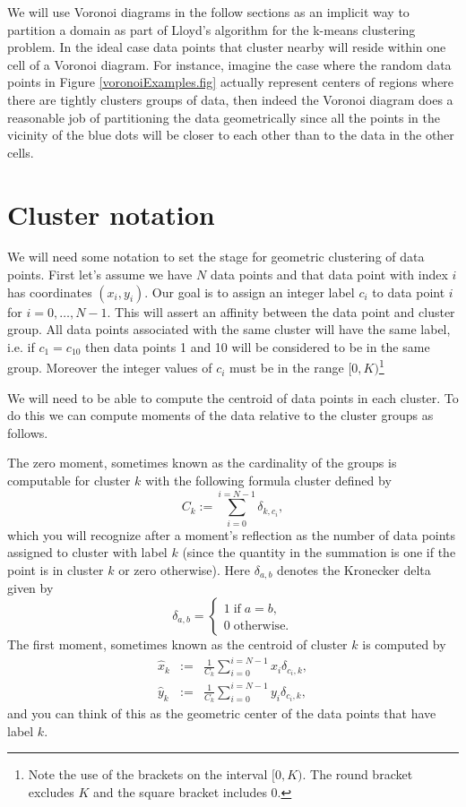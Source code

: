 We will use Voronoi diagrams in the follow sections as an implicit way to partition a domain as part of Lloyd's algorithm for the k-means clustering problem. In the ideal case data points that cluster nearby will reside within one cell of a Voronoi diagram. For instance, imagine the case where the random data points in Figure \ref{voronoiExamples.fig} actually represent centers of regions where there are tightly clusters groups of data, then indeed the Voronoi diagram does a reasonable job of partitioning the data geometrically since all the points in the vicinity of the blue dots will be closer to each other than to the data in the other cells.


\section{Cluster notation}

We will need some notation to set the stage for geometric clustering of data points. First let's assume we have $N$ data points and that data point with index $i$ has coordinates $(x_i,y_i)$. Our goal is to assign an integer label $c_i$ to data point $i$ for $i=0,\ldots,N-1$. This will assert an affinity between the data point and cluster group. All data points associated with the same cluster will have the same label, i.e. if $c_1 = c_{10}$ then data points 1 and 10 will be considered to be in the same group. Moreover the integer values of $c_i$ must be in the range $[0,K)$\footnote{Note the use of the brackets on the interval $[0,K)$. The round bracket excludes $K$ and the square bracket  includes $0$.}

We will need to be able to compute the centroid of data points in each cluster. To do this we can compute moments of the data relative to the cluster groups as follows. 

The zero moment, sometimes known as the cardinality of the groups is computable for cluster $k$ with the following formula cluster defined by
\[
C_k := \sum_{i=0}^{i=N-1} \delta_{k,c_i},
\]
which you will recognize after a moment's reflection as the number of data points assigned to cluster with label $k$ (since the quantity in the summation is one if the point is in cluster $k$ or zero otherwise). Here $\delta_{a,b}$ denotes the Kronecker delta given by
\[
\delta_{a,b} = \left\{ \begin{array}{l} 1\;\mbox{if}\;a=b, \\
0\;\mbox{otherwise}.
\end{array}\right.
\]
The first moment, sometimes known as the centroid of  cluster $k$ is computed by
\begin{eqnarray}
\hat{x}_k & := & \frac{1}{C_k} \sum_{i=0}^{i=N-1} x_i\delta_{c_i,k},\\ \hat{y}_k & := & \frac{1}{C_k} \sum_{i=0}^{i=N-1} y_i\delta_{c_i,k},
\end{eqnarray}
and you can think of this as the geometric center of the data points that have label $k$.

